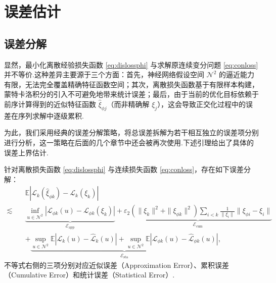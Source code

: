 \section{误差估计}\label{sec_main}
\subsection{误差分解}
显然，最小化离散经验损失函数 \eqref{eq:dislossphi} 与求解原连续变分问题 \eqref{eq:conloss} 并不等价.这种差异主要源于三个方面：首先，神经网络假设空间 $\mathcal{N}^{2}$ 的逼近能力有限，无法完全覆盖精确特征函数空间；其次，离散损失函数基于有限样本构建，蒙特卡洛积分的引入不可避免地带来统计误差；最后，由于当前的优化目标依赖于前序计算得到的近似特征函数 $\widehat{\xi}_{\phi j}$（而非精确解 $\xi_j$），这会导致正交化过程中的误差在序列求解中逐级累积.

为此，我们采用经典的误差分解策略，将总误差拆解为若干相互独立的误差项分别进行分析，这一策略在后面的几个章节中还会被再次使用.下述引理给出了具体的误差上界估计.
\begin{lemma}{}\label{lem:3.2}
针对离散损失函数 \eqref{eq:dislossphi} 与连续损失函数 \eqref{eq:conloss}，存在如下误差分解：
\begin{equation*}
\begin{aligned}
&\mathbb{E}\left|\mathcal{L}_{k}\left(\widehat{\xi}_{\phi k}\right)-\mathcal{L}_{k}(\xi_{k})\right| \\
\lesssim\quad & \underbrace{\inf_{u \in \mathcal{N}^{2}}\left|\mathcal{L}_{\phi k}(u)-\mathcal{L}_{\phi k}(\xi_{k})\right| }_{\mathcal{E}_{\text{app}}}+\underbrace{\varepsilon_2(\|\xi_k\|^2+\|\xi_{\phi k}\|^2)\sum\limits_{i<k}\frac{1}{\|\xi_i\|}\|\xi_{\phi i}-\xi_{i}\|}_{\mathcal{E}_{\text{cum}}} \\
& + \underbrace{ \sup_{u \in \mathcal{N}^{2}}\mathbb{E}\left|\mathcal{L}_{k}(u)-\widehat{\mathcal{L}}_{k}(u)\right|+\sup_{u \in \mathcal{N}^{2}}\mathbb{E}\left|\mathcal{L}_{\phi k}(u)-\widehat{\mathcal{L}}_{\phi k}(u)\right|}_{\mathcal{E}_{\text{sta}}},
\end{aligned}
\end{equation*}
不等式右侧的三项分别对应近似误差（Approximation Error）、累积误差（Cumulative Error）和统计误差（Statistical Error）.
\end{lemma}

